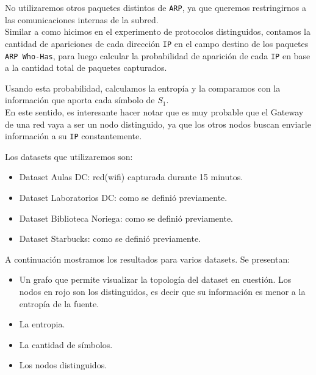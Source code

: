 No utilizaremos otros paquetes distintos de \texttt{ARP}, ya que queremos restringirnos a las comunicaciones internas de la subred. \\

Similar a como hicimos en el experimento de protocolos distinguidos, contamos la cantidad de apariciones de cada dirección \texttt{IP} en el campo destino de los paquetes \texttt{ARP Who-Has}, para luego calcular la probabilidad de aparición de cada \texttt{IP} en base a la cantidad total de paquetes capturados.

Usando esta probabilidad, calculamos la entropía y la comparamos con la información que aporta cada símbolo de $S_1$.\\

En este sentido, es interesante hacer notar que es muy probable que el Gateway de una red vaya a ser un nodo distinguido,
    ya que los otros nodos buscan enviarle información a su  \texttt{IP} constantemente.

\vspace{0.5em}

Los datasets que utilizaremos son:\\

\begin{itemize}
    \item Dataset Aulas DC: red(wifi) capturada durante 15 minutos.
    \item Dataset Laboratorios DC: como se definió previamente.
    \item Dataset Biblioteca Noriega: como se definió previamente.
    \item Dataset Starbucks: como se definió previamente.
\end{itemize}

\vspace{0.5em}

A continuación mostramos los resultados para varios datasets. Se presentan:

\begin{itemize}
    \item Un grafo que permite visualizar la topología del dataset en cuestión. Los nodos en rojo son los distinguidos, es decir que su información es menor a la entropía de la fuente.
    \item La entropia.
    \item La cantidad de símbolos.
    \item Los nodos distinguidos.
\end{itemize}

